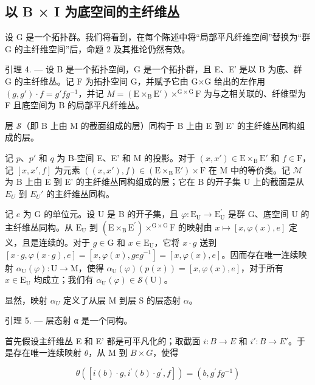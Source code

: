 \subsection{以 B × I 为底空间的主纤维丛}

设 G 是一个拓扑群。我们将看到，在每个陈述中将“局部平凡纤维空间”替换为“群 G 的主纤维空间”后，命题 2 及其推论仍然有效。

引理 4. --- 设 B 是一个拓扑空间，G 是一个拓扑群，且 E、E′ 是以 B 为底、群 G 的主纤维丛。记 F 为拓扑空间 G，并赋予它由 G×G 给出的左作用 \((g,g')\cdot f=g'fg^{-1}\)，并记 \(M = (\mathrm{E}\times_{\mathrm{B}}\mathrm{E}')\times^{\mathrm{G}\times\mathrm{G}}\mathrm{F}\) 为与之相关联的、纤维型为 F 且底空间为 B 的局部平凡纤维丛。

层 \(\mathcal{S}\)（即 B 上由 M 的截面组成的层）同构于 B 上由 E 到 E' 的主纤维丛同构组成的层。

记 \(p\)、\(p'\) 和 \(q\) 为 B-空间 E、E' 和 M 的投影。对于 \((x, x') \in \mathrm{E} \times_{\mathrm{B}} \mathrm{E}'\) 和 \(f \in \mathrm{F}\)，记 \([x, x', f]\) 为元素 \(((x, x'), f) \in (\mathrm{E} \times_{\mathrm{B}} \mathrm{E}') \times \mathrm{F}\) 在 M 中的等价类。记 \(\mathcal{M}\) 为 B 上由 E 到 E' 的主纤维丛同构组成的层；它在 B 的开子集 U 上的截面是从 \(E_{U}\) 到 \(E_{U}'\) 的主纤维丛同构。

记 \(e\) 为 G 的单位元。设 U 是 B 的开子集，且 \(\varphi\colon\mathrm{E}_{\mathrm{U}}\to\mathrm{E}_{\mathrm{U}}^{\prime}\) 是群 G、底空间 U 的主纤维丛同构。从 \(\mathrm{E}_{\mathrm{U}}\) 到 \((\mathrm{E}\times_{\mathrm{B}}\mathrm{E}^{\prime})\times^{\mathrm{G}\times\mathrm{G}}\mathrm{F}\) 的映射由 \(x\mapsto[x,\varphi(x),e]\) 定义，且是连续的。对于 \(g\in\mathrm{G}\) 和 \(x\in\mathrm{E}_{\mathrm{U}}\)，它将 \(x\cdot g\) 送到 \([x\cdot g,\varphi(x\cdot g),e]=[x,\varphi(x),geg^{-1}]=[x,\varphi(x),e]\)。因而存在唯一连续映射 \(\alpha_{\mathrm{U}}(\varphi)\colon\mathrm{U}\to\mathrm{M}\)，使得 \(\alpha_{\mathrm{U}}(\varphi)(p(x))=[x,\varphi(x),e]\)，对于所有 \(x\in\mathrm{E}_{\mathrm{U}}\) 均成立；我们有 \(\alpha_{\mathrm{U}}(\varphi)\in\mathcal{S}(\mathrm{U})\)。

显然，映射 \(\alpha_{U}\) 定义了从层 M 到层 S 的层态射 \(\alpha\)。

引理 5. --- 层态射 α 是一个同构。

首先假设主纤维丛 E 和 E' 都是可平凡化的；取截面 \(i: B \to E\) 和 \(i': B \to E'\)。于是存在唯一连续映射 \(\theta\)，从 M 到 \(B \times G\)，使得

\[
\theta ([ i (b) \cdot g, i ^ {\prime} (b) \cdot g ^ {\prime}, f ]) = (b, g ^ {\prime} f g ^ {- 1})
\]

